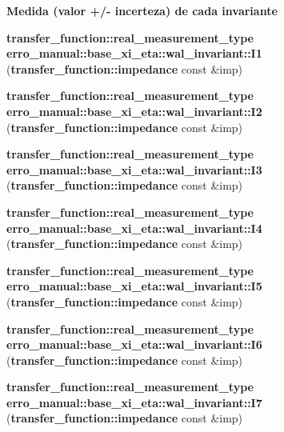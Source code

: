 \begin{Indent}{\bf Medida (valor +/- incerteza) de cada invariante}\par
\begin{CompactItemize}
\item 
{\bf transfer\_\-function::real\_\-measurement\_\-type} \textbf{erro\_\-manual::base\_\-xi\_\-eta::wal\_\-invariant::I1} ({\bf transfer\_\-function::impedance} const \&imp)\label{namespaceerro__manual_1_1base__xi__eta_1_1wal__invariant_0a69d5b5f6de27a8cff44e3861482e20}

\item 
{\bf transfer\_\-function::real\_\-measurement\_\-type} \textbf{erro\_\-manual::base\_\-xi\_\-eta::wal\_\-invariant::I2} ({\bf transfer\_\-function::impedance} const \&imp)\label{namespaceerro__manual_1_1base__xi__eta_1_1wal__invariant_bdcd83836522214a8ac2f4383d8e8767}

\item 
{\bf transfer\_\-function::real\_\-measurement\_\-type} \textbf{erro\_\-manual::base\_\-xi\_\-eta::wal\_\-invariant::I3} ({\bf transfer\_\-function::impedance} const \&imp)\label{namespaceerro__manual_1_1base__xi__eta_1_1wal__invariant_8ca277a2ca2a322e45c02d8325a6e88a}

\item 
{\bf transfer\_\-function::real\_\-measurement\_\-type} \textbf{erro\_\-manual::base\_\-xi\_\-eta::wal\_\-invariant::I4} ({\bf transfer\_\-function::impedance} const \&imp)\label{namespaceerro__manual_1_1base__xi__eta_1_1wal__invariant_5d0c90744756f67a6bfd9f976d225896}

\item 
{\bf transfer\_\-function::real\_\-measurement\_\-type} \textbf{erro\_\-manual::base\_\-xi\_\-eta::wal\_\-invariant::I5} ({\bf transfer\_\-function::impedance} const \&imp)\label{namespaceerro__manual_1_1base__xi__eta_1_1wal__invariant_d765f48818889fcd91061a052b01f2d3}

\item 
{\bf transfer\_\-function::real\_\-measurement\_\-type} \textbf{erro\_\-manual::base\_\-xi\_\-eta::wal\_\-invariant::I6} ({\bf transfer\_\-function::impedance} const \&imp)\label{namespaceerro__manual_1_1base__xi__eta_1_1wal__invariant_8262f95c5cfb35bf58b155ee40af3889}

\item 
{\bf transfer\_\-function::real\_\-measurement\_\-type} \textbf{erro\_\-manual::base\_\-xi\_\-eta::wal\_\-invariant::I7} ({\bf transfer\_\-function::impedance} const \&imp)\label{namespaceerro__manual_1_1base__xi__eta_1_1wal__invariant_42e250e21e2415de0ee08f99e2aad74e}


\end{CompactItemize}
\end{Indent}
